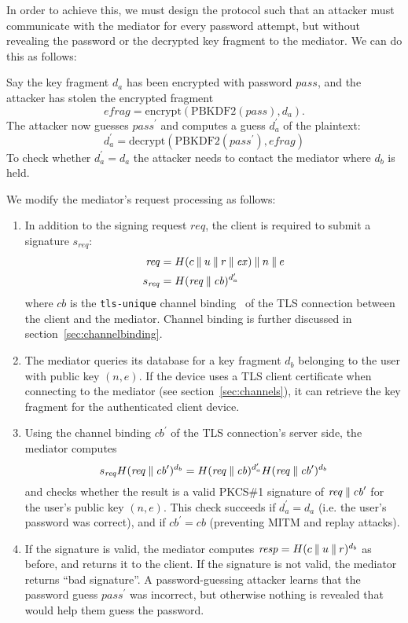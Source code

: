 In order to achieve this, we must design the protocol such that an attacker must communicate with
the mediator for every password attempt, but without revealing the password or the decrypted key
fragment to the mediator. We can do this as follows:

Say the key fragment $d_a$ has been encrypted with password $\mathit{pass}$, and the attacker has
stolen the encrypted fragment
$$\mathit{efrag} = \mathrm{encrypt}(\mathrm{PBKDF2}(\mathit{pass}), d_a).$$
The attacker now guesses $\mathit{pass}^\prime$ and computes a guess $d_a^\prime$ of the plaintext:
$$d_a^\prime = \mathrm{decrypt}(\mathrm{PBKDF2}(\mathit{pass}^\prime), \mathit{efrag})$$
To check whether $d_a^\prime = d_a$ the attacker needs to contact the mediator where $d_b$ is held.

We modify the mediator's request processing as follows:
\begin{enumerate}
\item In addition to the signing request $\mathit{req}$, the client is required to submit a
signature $s_\mathit{req}$:
\begin{align*}
    \mathit{req} &= H(c \mathbin{\|} u \mathbin{\|} r \mathbin{\|} \mathit{ex}) \mathbin{\|} n \mathbin{\|} e \\
    s_\mathit{req} &= H(\mathit{req} \mathbin{\|} \mathit{cb})^{d_a^\prime}
\end{align*}
where $\mathit{cb}$ is the \texttt{tls-unique} channel binding~\cite{ChannelBinding}
of the TLS connection between the client and the mediator. Channel binding is further discussed in
section~\ref{sec:channelbinding}.
\item The mediator queries its database for a key fragment $d_b$ belonging to the user with public
key $(n, e)$. If the device uses a TLS client certificate when connecting to the mediator (see
section~\ref{sec:channels}), it can retrieve the key fragment for the authenticated client device.
\item Using the channel binding $\mathit{cb}^\prime$ of the TLS connection's server side, the
mediator computes
$$s_\mathit{req} H(\mathit{req} \mathbin{\|} \mathit{cb}^\prime)^{d_b} =
  H(\mathit{req} \mathbin{\|} \mathit{cb})^{d_a^\prime} H(\mathit{req} \mathbin{\|} \mathit{cb}^\prime)^{d_b}$$
and checks whether the result is a valid PKCS\#1 signature of
$\mathit{req} \mathbin{\|} \mathit{cb}^\prime$ for the user's public key $(n, e)$. This check succeeds if
$d_a^\prime = d_a$ (i.e. the user's password was correct), and if $\mathit{cb}^\prime = \mathit{cb}$
(preventing MITM and replay attacks).
\item If the signature is valid, the mediator computes
$\mathit{resp} = H(c \mathbin{\|} u \mathbin{\|} r)^{d_b}$ as before, and returns it to the client. If the
signature is not valid, the mediator returns ``bad signature''. A password-guessing attacker learns
that the password guess $\mathit{pass}^\prime$ was incorrect, but otherwise nothing is revealed that
would help them guess the password.
\end{enumerate}

